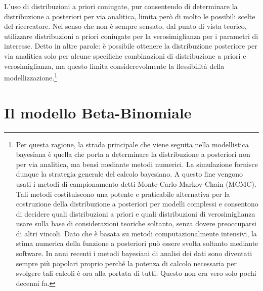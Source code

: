 \documentclass[
  11pt,
  italian,
  a4paper,
  extrafontsizes,onecolumn,openright
  ]{memoir}
\theoremstyle{definition}
\theoremstyle{definition}
\theoremstyle{definition}
\theoremstyle{definition}
\theoremstyle{remark}
\begin{document}
L'uso di distribuzioni a priori coniugate, pur consentendo di determinare la distribuzione a posteriori per via analitica, limita però di molto le possibili scelte del ricercatore. Nel senso che non è sempre sensato, dal punto di vista teorico, utilizzare distribuzioni a priori coniugate per la verosimiglianza per i parametri di interesse. Detto in altre parole: è possibile ottenere la distribuzione posteriore per via analitica solo per alcune specifiche combinazioni di distribuzione a priori e verosimiglianza, ma questo limita considerevolmente la flessibilità della modellizzazione.\footnote{Per questa ragione, la strada principale che viene seguita nella modellistica bayesiana è quella che porta a determinare la distribuzione a posteriori non per via analitica, ma bensì mediante metodi numerici. La simulazione fornisce dunque la strategia generale del calcolo bayesiano. A questo fine vengono usati i metodi di campionamento detti Monte-Carlo Markov-Chain (MCMC). Tali metodi costituiscono una potente e praticabile alternativa per la costruzione della distribuzione a posteriori per modelli complessi e consentono di decidere quali distribuzioni a priori e quali distribuzioni di verosimiglianza usare sulla base di considerazioni teoriche soltanto, senza dovere preoccuparsi di altri vincoli. Dato che è basata su metodi computazionalmente intensivi, la stima numerica della funzione a posteriori può essere svolta soltanto mediante software. In anni recenti i metodi bayesiani di analisi dei dati sono diventati sempre più popolari proprio perché la potenza di calcolo necessaria per svolgere tali calcoli è ora alla portata di tutti. Questo non era vero solo pochi decenni fa.}

\hypertarget{chapter-distr-priori-coniugate}{%
\section{Il modello Beta-Binomiale}\label{chapter-distr-priori-coniugate}}
\end{document}
